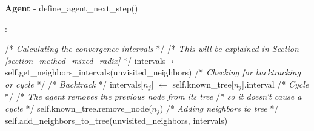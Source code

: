 \begin{algorithm}
\caption{\textbf{Agent} - define\_agent\_next\_step()}
\label{alg:define_agent_next_step}
\begin{algorithmic}
    :

        \State /* \textit{Calculating the convergence intervals} */
        \State /* \textit{This will be explained in Section \ref{section_method_mixed_radix}} */
        \State intervals $\gets$ self.get\_neighbors\_intervals(unvisited\_neighbors)
        \State
        \State /* \textit{Checking for backtracking or cycle} */
                    \State /* \textit{Backtrack} */
                    \State intervals[$n_{j}$] $\gets$ self.known\_tree[$n_{j}$].interval
                \Else
                    \State /* \textit{Cycle} */
                    \State /* \textit{The agent removes the previous node from its tree} 
                    \State /* \textit{so it doesn't cause a cycle} */
                    \State self.known\_tree.remove\_node($n_{j}$)
                \EndIf
            \EndIf
        \EndFor
        \State
        \State /* \textit{Adding neighbors to tree} */
        \State self.add\_neighbors\_to\_tree(unvisited\_neighbors, intervals)
\end{algorithmic}
\end{algorithm}
